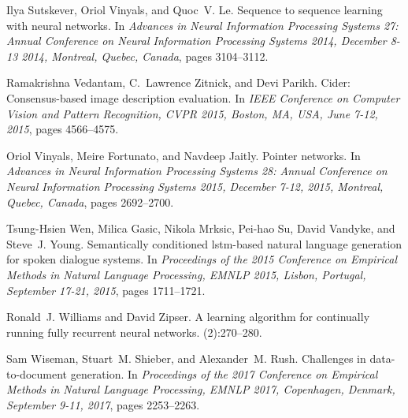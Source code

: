 \documentclass[runningheads, envcountsame, a4paper]{llncs}
\begin{document}
\begin{thebibliography}{10}
Ilya Sutskever, Oriol Vinyals, and Quoc~V. Le.
\newblock Sequence to sequence learning with neural networks.
\newblock In {\em Advances in Neural Information Processing Systems 27: Annual
  Conference on Neural Information Processing Systems 2014, December 8-13 2014,
  Montreal, Quebec, Canada}, pages 3104--3112.

Ramakrishna Vedantam, C.~Lawrence Zitnick, and Devi Parikh.
\newblock Cider: Consensus-based image description evaluation.
\newblock In {\em {IEEE} Conference on Computer Vision and Pattern Recognition,
  {CVPR} 2015, Boston, MA, USA, June 7-12, 2015}, pages 4566--4575.

Oriol Vinyals, Meire Fortunato, and Navdeep Jaitly.
\newblock Pointer networks.
\newblock In {\em Advances in Neural Information Processing Systems 28: Annual
  Conference on Neural Information Processing Systems 2015, December 7-12,
  2015, Montreal, Quebec, Canada}, pages 2692--2700.

Tsung-Hsien Wen, Milica Gasic, Nikola Mrksic, Pei-hao Su, David Vandyke, and
  Steve~J. Young.
\newblock Semantically conditioned lstm-based natural language generation for
  spoken dialogue systems.
\newblock In {\em Proceedings of the 2015 Conference on Empirical Methods in
  Natural Language Processing, {EMNLP} 2015, Lisbon, Portugal, September 17-21,
  2015}, pages 1711--1721.

Ronald~J. Williams and David Zipser.
\newblock A learning algorithm for continually running fully recurrent neural
  networks.
(2):270--280.

Sam Wiseman, Stuart~M. Shieber, and Alexander~M. Rush.
\newblock Challenges in data-to-document generation.
\newblock In {\em Proceedings of the 2017 Conference on Empirical Methods in
  Natural Language Processing, {EMNLP} 2017, Copenhagen, Denmark, September
  9-11, 2017}, pages 2253--2263.

\end{thebibliography}
\end{document}
